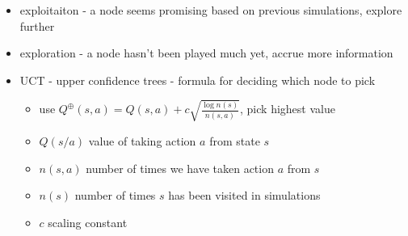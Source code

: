 \documentclass[11pt]{article}
\newcommand{\ee}[1]{\ensuremath{#1}}
\begin{document}
\begin{description}
\begin{itemize}
	\begin{itemize}
		\item exploitaiton - a node seems promising based on previous simulations, explore further
		\item exploration - a node hasn't been played much yet, accrue more information
		\item UCT - upper confidence trees - formula for deciding which node to pick
		\begin{itemize}
			\item use \ee{Q^{\oplus}(s,a) = Q(s,a) + c\sqrt{\frac{\log n(s)}{n(s,a)}}}, pick highest value
			\item \ee{Q(s/a)} value of taking action \ee{a} from state \ee{s}
			\item \ee{n(s,a)} number of times we have taken action \ee{a} from \ee{s}
			\item \ee{n(s)} number of times \ee{s} has been visited in simulations
			\item \ee{c} scaling constant
		\end{itemize}
	\end{itemize}
\end{itemize}


\end{description}
\end{document}
